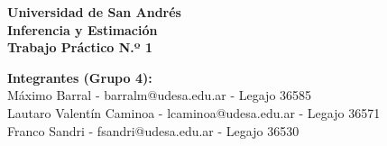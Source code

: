 \documentclass[12pt]{article}
\begin{document}
\thispagestyle{empty}

\thispagestyle{empty}
\begin{center}
    \vspace*{\fill}

    {\Large \textbf{Universidad de San Andrés}}\\[0.8cm]
    {\Huge \textbf{Inferencia y Estimación}}\\[0.6cm]
    {\LARGE \textbf{Trabajo Práctico N.º 1}}\\[1.5cm]
    

    \vspace{1.2cm}

    {\large \textbf{Integrantes (Grupo 4):}}\\[0.4cm]
    {\large Máximo Barral - barralm@udesa.edu.ar - Legajo 36585}\\[0.2cm]
    {\large Lautaro Valentín Caminoa - lcaminoa@udesa.edu.ar - Legajo 36571}\\[0.2cm]
    {\large Franco Sandri - fsandri@udesa.edu.ar - Legajo 36530}\\[1.4cm]


\end{center}
\end{document}
